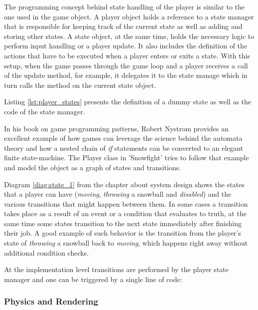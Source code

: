 The programming concept behind state handling of the player is similar to the
one used in the game object. A player object holds a reference to a state
manager that is responsible for keeping track of the current state as well as
adding and storing other states. A state object, at the same time, holds the
necessary logic to perform input handling or a player update. It also includes
the definition of the actions that have to be executed when a player enters or
exits a state. With this setup, when the game passes through the game loop and
a player receives a call of the update method, for example, it delegates it to
the state manage which in turn calls the method on the current state object.

Listing \ref{lst:player_states} presents the definition of a
dummy state as well as the code of the state manager.



In his book on game programming patterns\cite{game_patterns}, Robert Nystrom
provides an excellent example of how games can leverage the science behind the
automata theory and how a nested chain of \emph{if} statements can be converted
to an elegant finite state-machine. The Player class in 'Snowfight' tries to
follow that example and model the object as a graph of states and transitions.

Diagram \ref{diag:state_1} from the chapter about system design shows the states
that a player can have (\emph{moving}, \emph{throwing} a snowball and
\emph{disabled}) and the various transitions that might happen between them. In
some cases a transition takes place as a result of an event or a condition that
evaluates to truth, at the same time some states transition to the next state
immediately after finishing their job. A good example of such behavior is the
transition from the player's state of \emph{throwing} a snowball back to
\emph{moving}, which happens right away without additional condition checks.

At the implementation level transitions are performed by the player state
manager and one can be triggered by a single line of code:




\subsubsection{Physics and Rendering}

